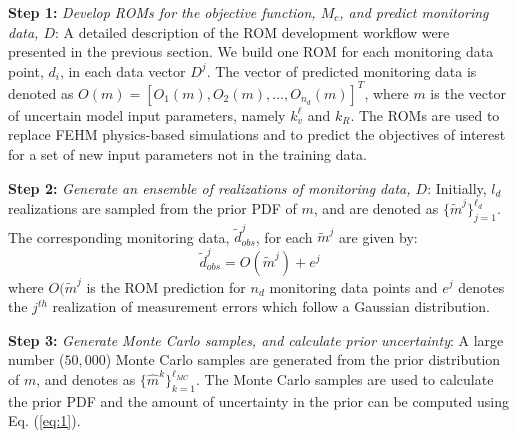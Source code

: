 \documentclass[10pt, twoside]{article}
\begin{document}
\textbf{Step 1:} \textit{Develop ROMs for the objective function, $M_c$, and predict monitoring data, $D$}: A detailed description of the ROM development workflow were presented in the previous section. We build one ROM for each monitoring data point, $d_i$, in each data vector $D^j$. The vector of predicted monitoring data is denoted as $O(m)=[O_1(m), O_2(m), \ldots,O_{n_d}(m)]^T$, where $m$ is the vector of uncertain model input parameters, namely $k_v^\ell$ and $k_R$. The ROMs are used to replace FEHM physics-based simulations and to predict the objectives of interest for a set of new input parameters not in the training data.

\textbf{Step 2:} \textit{Generate an ensemble of realizations of monitoring data, $D$}: Initially, $l_d$ realizations are sampled from the prior PDF of $m$, and are denoted as $ \{\widetilde{m}^j\}_{j=1}^{\ell_d}$. The corresponding monitoring data, $\widetilde{d}_{obs}^j$, for each $\widetilde{m}^j$ are given by:
\begin{equation} \label{eq:4}
    \widetilde{d}_{obs}^j = O(\widetilde{m}^j) + e^j
\end{equation}
where $O(\widetilde{m}^j$ is the ROM prediction for $n_d$ monitoring data points and $e^j$ denotes the $j^{th}$ realization of measurement errors which follow a Gaussian distribution.

\textbf{Step 3:} \textit{Generate Monte Carlo samples, and calculate prior uncertainty}: A large number ($50,000$) Monte Carlo samples are generated from the prior distribution of $m$, and denotes as $\{\hat{m}^k\}_{k=1}^{\ell_{MC}}$. The Monte Carlo samples are used to calculate the prior PDF and the amount of uncertainty in the prior can be computed using Eq. (\ref{eq:1}).
\end{document}

